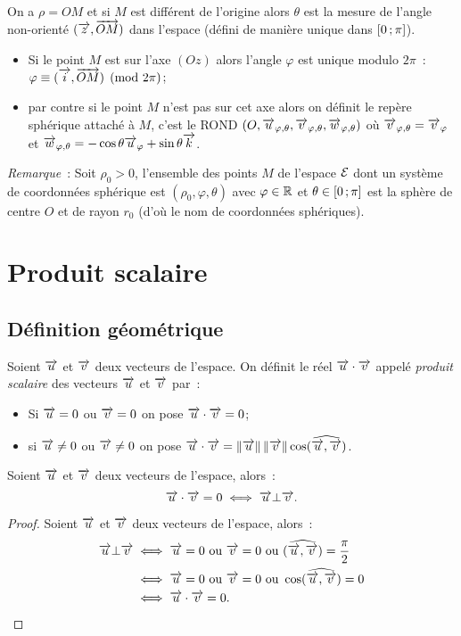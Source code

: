 On a \(\rho=OM\) et si \(M\) est différent de l'origine alors \(\theta\) est la mesure de l'angle non-orienté \((\overrightarrow{z},\overrightarrow{OM})\) dans l'espace (défini de manière unique dans \(\left[ 0 \, ;  \pi \right]\)).
\begin{itemize}
\item Si le point \(M\) est sur l'axe \((Oz)\) alors l'angle \(\varphi\) est unique modulo \(2\pi\)~: \(\varphi \equiv (\overrightarrow{i},\overrightarrow{OM}) \pmod {2\pi}\);
\item par contre si le point \(M\) n'est pas sur cet axe alors on définit le repère sphérique attaché à \(M\), c'est le ROND \((O,\overrightarrow{u}_{\varphi,\theta},\overrightarrow{v}_{\varphi,\theta},\overrightarrow{w}_{\varphi,\theta})\) où \(\overrightarrow{v}_{\varphi,\theta}=\overrightarrow{v}_{\varphi}\) et \(\overrightarrow{w}_{\varphi,\theta}=-\cos\theta\overrightarrow{u}_\varphi+\sin\theta\overrightarrow{k}\).
\end{itemize}

\emph{Remarque}~: Soit \(\rho_0>0\), l'ensemble des points \(M\) de l'espace \(\mathcal{E}\) dont un système de coordonnées sphérique est \((\rho_0,\varphi,\theta)\) avec \(\varphi\in\mathbb{R}\) et \(\theta\in \left[ 0 \, ;  \pi \right]\) est la sphère de centre \(O\) et de rayon \(r_0\) (d'où le nom de coordonnées sphériques).

\section{Produit scalaire}
\subsection{Définition géométrique}
\begin{defdef}
  Soient \(\overrightarrow{u}\) et \(\overrightarrow{v}\) deux vecteurs de l'espace. On définit le réel \(\overrightarrow{u}\cdot\overrightarrow{v}\) appelé \emph{produit scalaire} des vecteurs \(\overrightarrow{u}\) et \(\overrightarrow{v}\) par~:
  \begin{itemize}
  \item Si \(\overrightarrow{u}=0\) ou \(\overrightarrow{v}=0\) on pose \(\overrightarrow{u}\cdot\overrightarrow{v}=0\);
  \item si \(\overrightarrow{u}\neq 0\) ou \(\overrightarrow{v}\neq 0\) on pose \(\overrightarrow{u}\cdot\overrightarrow{v}=\left\lVert\overrightarrow{u}\right\rVert\left\lVert\overrightarrow{v}\right\rVert\cos(\widehat{\overrightarrow{u},\overrightarrow{v}})\).
  \end{itemize}
\end{defdef}
\begin{prop}
Soient \(\overrightarrow{u}\) et \(\overrightarrow{v}\) deux vecteurs de l'espace, alors~:
\begin{equation}
  \overrightarrow{u}\cdot\overrightarrow{v}=0 \iff \overrightarrow{u} \bot \overrightarrow{v}.
\end{equation}
\end{prop}
\begin{proof}
  Soient \(\overrightarrow{u}\) et \(\overrightarrow{v}\) deux vecteurs de l'espace, alors~:
  \begin{align}
    \overrightarrow{u} \bot \overrightarrow{v} &\iff \overrightarrow{u}=0 \text{~ou~} \overrightarrow{v}=0 \text{~ou~} (\widehat{\overrightarrow{u},\overrightarrow{v}})=\frac{\pi}{2}\\
&\iff \overrightarrow{u}=0 \text{~ou~} \overrightarrow{v}=0 \text{~ou~} \cos(\widehat{\overrightarrow{u},\overrightarrow{v}})=0\\
&\iff \overrightarrow{u}\cdot\overrightarrow{v}=0.
  \end{align}
\end{proof}


